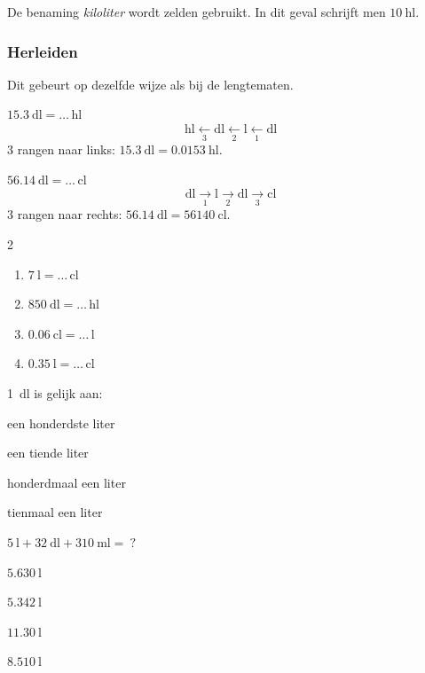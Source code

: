 \documentclass{bis}
\begin{document}
De benaming \emph{kiloliter} wordt zelden gebruikt. In dit geval schrijft men \(\SI{10}{\hecto\litre}\).

\subsubsection{Herleiden}
Dit gebeurt op dezelfde wijze als bij de lengtematen.

\begin{voorbeeld}
\(\SI{15.3}{\deci\litre}=\ldots\,\si{\hecto\litre}\)
\[
\si{\hecto\litre} \xleftarrow[3]{}\si{\deca\litre} \xleftarrow[2]{}\si{\litre} \xleftarrow[1]{}\si{\deci\litre}
\]
3 rangen naar links: \(\SI{15.3}{\deci\litre}=\SI{0.0153}{\hecto\litre}\).
\end{voorbeeld}

\begin{voorbeeld}
\(\SI{56.14}{\deca\litre}=\ldots\,\si{\centi\litre}\)
\[
\si{\deca\litre} \xrightarrow[1]{}\si{\litre} \xrightarrow[2]{}\si{\deci\litre} \xrightarrow[3]{}\si{\centi\litre}
\]
3 rangen naar rechts: \(\SI{56.14}{\deca\litre}=\SI{56140}{\centi\litre}\).
\end{voorbeeld}

\begin{exercise}
\begin{multicols}{2}
\begin{enumerate}
  \item \(\SI{7}{\litre}=\ldots\,\si{\centi\litre}\)
  \item \(\SI{850}{\deci\litre}=\ldots\,\si{\hecto\litre}\)
  \item \(\SI{0.06}{\centi\litre}=\ldots\,\si{\litre}\)
  \item \(\SI{0.35}{\litre}=\ldots\,\si{\centi\litre}\)
\end{enumerate}
\end{multicols}

\SI{1}{\deci\litre} is gelijk aan:
\begin{meerkeuze}
  \item een honderdste liter
  \item een tiende liter
  \item honderdmaal een liter
  \item tienmaal een liter
\end{meerkeuze}

\medskip
\(\SI{5}{\litre}+\SI{32}{\deci\litre}+\SI{310}{\milli\litre}=\ ?\)
\begin{meerkeuze}
  \item \(\SI{5.630}{\litre}\)
  \item \(\SI{5.342}{\litre}\)
  \item \(\SI{11.30}{\litre}\)
  \item \(\SI{8.510}{\litre}\)
\end{meerkeuze}
\end{exercise}
\end{document}
